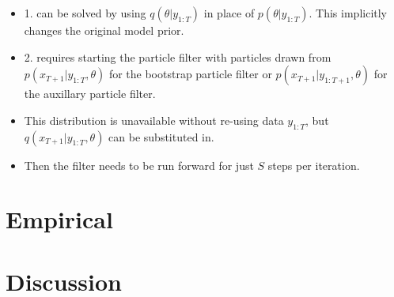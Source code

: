 \documentclass[12pt,a4paper]{article}%
\numberwithin{equation}{section}
\begin{document}
\begin{itemize}
\begin{enumerate}
\end{enumerate}
\item 1. can be solved by using $q(\theta | y_{1:T})$ in place of $p(\theta | y_{1:T})$. This implicitly changes the original model prior.
\item 2. requires starting the particle filter with particles drawn from $p(x_{T+1} | y_{1:T}, \theta)$ for the bootstrap particle filter or $p(x_{T+1} | y_{1:T+1}, \theta)$ for the auxillary particle filter. 
\item This distribution is unavailable without re-using data $y_{1:T}$, but $q(x_{T+1} | y_{1:T}, \theta)$ can be substituted in.
\item Then the filter needs to be run forward for just $S$ steps per iteration.
\end{itemize}



\section{Empirical}

\section{Discussion}



 
\end{document}
